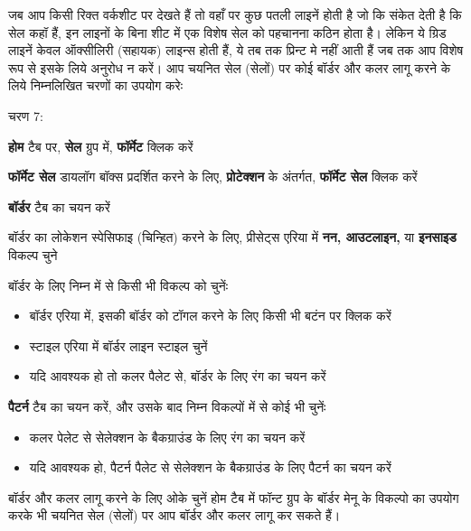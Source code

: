 जब आप किसी रिक्त वर्कशीट पर देखते हैं तो वहाँ पर कुछ पतली लाइनें होती है जो कि संकेत देती है कि सेल कहॉ हैं, इन लाइनों के बिना शीट में एक विशेष सेल को पहचानना कठिन होता है। लेकिन ये ग्रिड लाइनें केवल ऑक्सीलिरी (सहायक) लाइन्स होती हैं, ये तब तक प्रिन्ट मे नहीं आती हैं जब तक आप विशेष रूप से इसके लिये अनुरोध न करें। आप चयनित सेल (सेलों) पर कोई बॉर्डर और कलर लागू करने के लिये निम्नलिखित चरणों का उपयोग करेः
\begin{descriptionSimple}{चरण 7:}
\item[चरण 1] \textbf{होम} टैब पर, \textbf{सेल} ग्रुप में, \textbf{फॉर्मेट} क्लिक करें
\item[चरण 2] \textbf{फॉर्मेट सेल} डायलॉग बॉक्स प्रदर्शित करने के लिए, \textbf{प्रोटेक्शन} के अंतर्गत, \textbf{फॉर्मेट सेल} क्लिक करें
\item[चरण 3] \textbf{बॉर्डर} टैब का चयन करें
\item[चरण 4] बॉर्डर का लोकेशन स्पेसिफाइ (चिन्हित) करने के लिए, प्रीसेट्स एरिया में \textbf{नन, आउटलाइन,} या \textbf{इनसाइड} विकल्प चुने
\item[चरण 5] बॉर्डर के लिए निम्न में से किसी भी विकल्प को चुनेंः
  \begin{itemize}
    \item बॉर्डर एरिया में, इसकी बॉर्डर को टॉगल करने के लिए किसी भी बटंन पर क्लिक करें
    \item स्टाइल एरिया में बॉर्डर लाइन स्टाइल चुनें
    \item यदि आवश्यक हो तो कलर पैलेट से, बॉर्डर के लिए रंग का चयन करें
  \end{itemize}
\item[चरण 6] \textbf{पैटर्न} टैब का चयन करें, और उसके बाद निम्न विकल्पों में से कोई भी चुनेंः
  \begin{itemize}
    \item कलर पेलेट से सेलेक्शन के बैकग्राउंड के लिए रंग का चयन करें
    \item यदि आवश्यक हो, पैटर्न पैलेट से सेलेक्शन के बैकग्राउंड के लिए पैटर्न का चयन करें
  \end{itemize}
\item[चरण 7] बॉर्डर और कलर लागू करने के लिए ओके चुनें होम टैब में फॉन्ट ग्रुप के बॉर्डर मेनू के विकल्पो का उपयोग करके भी चयनित सेल (सेलों) पर आप बॉर्डर और कलर लागू कर सकते हैं।
\end{descriptionSimple}
\bigskip

